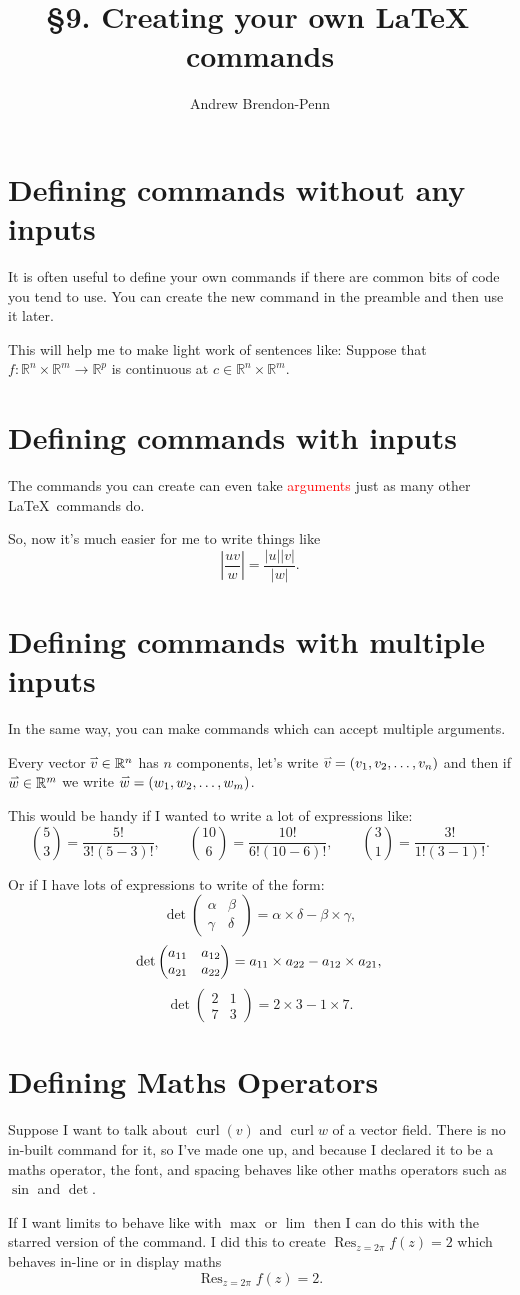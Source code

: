 \documentclass[a4paper,11pt]{article}
\title{\S 9. Creating your own \LaTeX \, commands}
\author{Andrew Brendon-Penn}
\newcommand{\R}{\mathbb{R}}
\newcommand{\brightidea}{\marginpar{\bclampe}}
\newcommand{\abs}[1]{\left| #1 \right|}
\newcommand{\keyword}[1]{\textcolor{red}{#1}}
\newcommand{\myvec}[1]{\accentset{\rightharpoonup}{#1}}%
\newcommand{\longvec}[2]{(#1_1, #1_2, \dotsc, #1_{#2})}
\newcommand{\chooseq}[2]{\binom{#1}{#2}=\frac{#1!}{#2!\left(#1-#2\right)!}}
\newcommand{\dettwobytwo}[4]{\det \begin{pmatrix}
 #1 & #2 \\
 #3 & #4
 \end{pmatrix} = #1\times#4-#2\times#3}
\DeclareMathOperator{\curl}{curl}
\DeclareMathOperator*{\Res}{Res}
\begin{document}
\maketitle

\section{Defining commands without any inputs}

It is often useful to define your own commands if there are common bits of code you tend to use. You can create the new command in the preamble and then use it later.

This will help me to make light work of sentences like:
Suppose that $f : \R^n \times \R^m \to \R^p$ is continuous at $c \in \R^n\times \R^m$. \brightidea

\section{Defining commands with inputs}

The commands you can create can even take \keyword{arguments} just as many other \LaTeX\, commands do.

So, now it's much easier for me to write things like
\[
\abs{\frac{uv}{w}} = \frac{\abs{u}\abs{v}}{\abs{w}}.
\]

\section{Defining commands with multiple inputs}

In the same way, you can make commands which can accept multiple arguments.

Every vector $\myvec{v} \in \R^n$  has $n$ components, let's write $\myvec{v}=\longvec{v}{n}$ and then if $\myvec{w}\in \R^m$ we write $\myvec{w}=\longvec{w}{m}$.

This would be handy if I wanted to write a lot of expressions like:
\[
\chooseq{5}{3},
\qquad
\chooseq{10}{6},
\qquad
\chooseq{3}{1}.
\]

Or if I have lots of expressions to write of the form:
\[
\dettwobytwo{\alpha}{\beta}{\gamma}{\delta},
\]
\[
\dettwobytwo{a_{11}}{a_{12}}{a_{21}}{a_{22}},\\
\]
\[
\dettwobytwo{2}{1}{7}{3}.
\]

\section{Defining Maths Operators}

Suppose I want to talk about $\curl(v)$ and $\curl w$ of a vector field. There is no in-built command for it, so I've made one up, and because I declared it to be a maths operator, the font, and spacing behaves like other maths operators such as $\sin$ and $\det$.

If I want limits to behave like with $\max$ or $\lim$ then I can do this with the starred version of the command. I did this to create $\Res_{z=2\pi}f(z)=2$ which behaves in-line or in display maths
\[
\Res_{z=2\pi}f(z)=2.
\]
\end{document}
